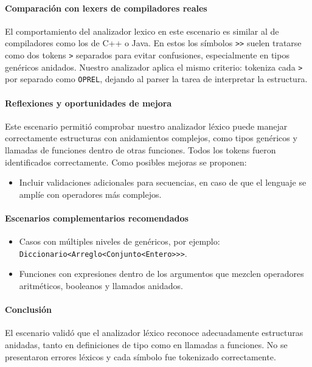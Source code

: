 \documentclass{article}
\begin{document}
\paragraph{Comparación con lexers de compiladores reales}

El comportamiento del analizador lexico en este escenario es similar al de compiladores como los de C++ o Java. En estos los símbolos \lstinline{>>} suelen tratarse como dos tokens \lstinline{>} separados para evitar confusiones, especialmente en tipos genéricos anidados. Nuestro analizador aplica el mismo criterio: tokeniza cada \lstinline{>} por separado como \lstinline{OPREL}, dejando al parser la tarea de interpretar la estructura. 

\paragraph{Reflexiones y oportunidades de mejora}
Este escenario permitió comprobar nuestro analizador léxico puede manejar correctamente estructuras con anidamientos complejos, como tipos genéricos y llamadas de funciones dentro de otras funciones. Todos los tokens fueron identificados correctamente. Como posibles mejoras se proponen:

\begin{itemize}
\item Incluir validaciones adicionales para secuencias, en caso de que el lenguaje se amplíe con operadores más complejos.
\end{itemize}

\paragraph{Escenarios complementarios recomendados}
\begin{itemize}
\item Casos con múltiples niveles de genéricos, por ejemplo: \lstinline{Diccionario<Arreglo<Conjunto<Entero>>>}.
\item Funciones con expresiones dentro de los argumentos que mezclen operadores aritméticos, booleanos y llamados anidados.
\end{itemize}

\paragraph{Conclusión}
El escenario validó que el analizador léxico reconoce adecuadamente estructuras anidadas, tanto en definiciones de tipo como en llamadas a funciones. No se presentaron errores léxicos y cada símbolo fue tokenizado correctamente.
\end{document}
